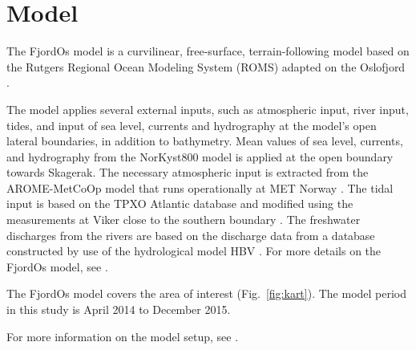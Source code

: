 \section{Model}

The FjordOs model is a curvilinear, free-surface, terrain-following model based on the Rutgers Regional Ocean Modeling System (ROMS) \citep{haidv:etal:2008,shche:mcwil:2003,shche:mcwil:2005,shche:mcwil:2009} adapted on the Oslofjord \citep{roed:etal:2016}. 

The model applies several external inputs, such as atmospheric input, river input, tides, and input of sea level, currents and hydrography at the model's open lateral boundaries, in addition to bathymetry. Mean values of sea level, currents, and hydrography from the NorKyst800 model \citep{albre:etal:2011} is applied at the open boundary towards Skagerak. The necessary atmospheric input is extracted from the AROME-MetCoOp model that runs operationally at MET Norway \citep{mulle:etal:2015}. The tidal input is based on the TPXO Atlantic database \citep{egber:erofe:2002} and modified using the measurements at Viker close to the southern boundary \cite[]{hjelm:etal:2017}. The freshwater discharges from the rivers are based on the discharge data from a database constructed by use of the hydrological model HBV \citep{beldr:etal:2003}. For more details on the FjordOs model, see \cite{roed:etal:2016}.

The FjordOs model covers the area of interest (Fig.~\ref{fig:kart}). The model period in this study is April 2014 to December 2015.

For more information on the model setup, see \cite[]{roed:etal:2016}.


\newpage
